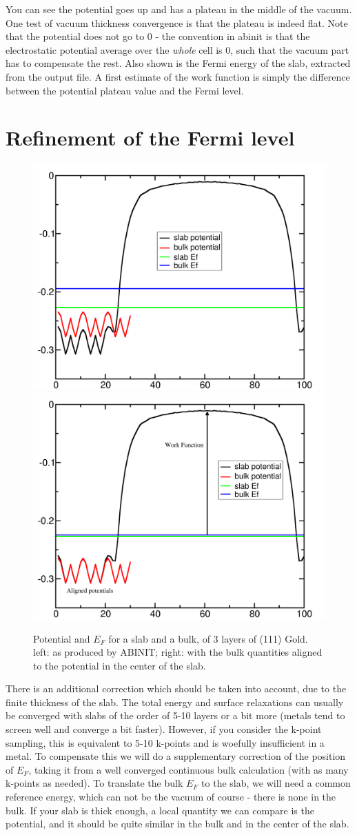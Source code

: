 \documentclass{report}
\begin{document}
You can see the potential goes up and has a plateau in the middle of the vacuum. One test of vacuum thickness convergence is that the plateau is indeed flat. Note that the potential does not go to 0 - the convention in abinit is that the electrostatic potential average over the \emph{whole} cell is 0, such that the vacuum part has to compensate the rest. Also shown is the Fermi energy of the slab, extracted from the output file. A first estimate of the work function is simply the difference between the potential plateau value and the Fermi level.

\section{Refinement of the Fermi level}
\begin{figure}[h]
\begin{center}
\includegraphics[width=0.48\linewidth]{workfunction_image1}
\includegraphics[width=0.48\linewidth]{workfunction_image2}
\caption{Potential and $E_F$ for a slab and a bulk, of 3 layers of (111) Gold. left: as produced by ABINIT; right: with the bulk quantities aligned to the potential in the center of the slab.}
\label{fig2}
\end{center}
\end{figure}

There is an additional correction which should be taken into account, due to the finite thickness of the slab. The total energy and surface relaxations can usually be converged with slabs of the order of 5-10 layers or a bit more (metals tend to screen well and converge a bit faster). However, if you consider the k-point sampling, this is equivalent to 5-10 k-points and is woefully insufficient in a metal. To compensate this we will do a supplementary correction of the position of $E_F$, taking it from a well converged continuous bulk calculation (with as many k-points as needed). To translate the bulk $E_F$ to the slab, we will need a common reference energy, which can not be the vacuum of course - there is none in the bulk. If your slab is thick enough, a local quantity we can compare is the potential, and it should be quite similar in the bulk and in the center of the slab.
\end{document}
